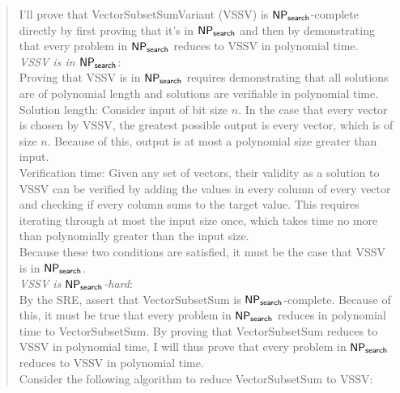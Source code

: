 \documentclass[11pt]{article}
\begin{document}
    \begin{quote}
        \color{purple}
        I'll prove that VectorSubsetSumVariant (VSSV) is $\mathsf{NP_{search}}$-complete directly by first proving that it's in $\mathsf{NP_{search}}$ and then by demonstrating that every problem in $\mathsf{NP_{search}}$ reduces to VSSV in polynomial time. \\

        \textit{VSSV is in $\mathsf{NP_{search}}$}: \\
        Proving that VSSV is in $\mathsf{NP_{search}}$ requires demonstrating that all solutions are of polynomial length and solutions are verifiable in polynomial time. \\
        
        Solution length: Consider input of bit size $n$. In the case that every vector is chosen by VSSV, the greatest possible output is every vector, which is of size $n$. Because of this, output is at most a polynomial size greater than input. \\

        Verification time: Given any set of vectors, their validity as a solution to VSSV can be verified by adding the values in every column of every vector and checking if every column sums to the target value. This requires iterating through at most the input size once, which takes time no more than polynomially greater than the input size. \\

        Because these two conditions are satisfied, it must be the case that VSSV is in $\mathsf{NP_{search}}$. \\

        \textit{VSSV is $\mathsf{NP_{search}}$-hard}: \\
        By the SRE, assert that VectorSubsetSum is $\mathsf{NP_{search}}$-complete. Because of this, it must be true that every problem in $\mathsf{NP_{search}}$ reduces in polynomial time to VectorSubsetSum. By proving that VectorSubsetSum reduces to VSSV in polynomial time, I will thus prove that every problem in $\mathsf{NP_{search}}$ reduces to VSSV in polynomial time. \\

        Consider the following algorithm to reduce VectorSubsetSum to VSSV: 


\end{quote}
\end{document}
